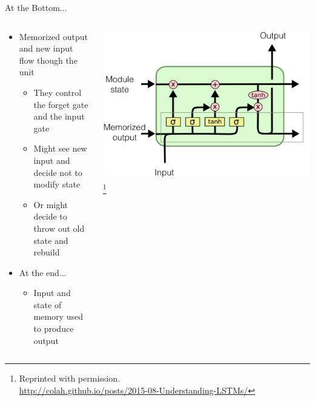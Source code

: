 \documentclass[aspectratio=169]{beamer}
\begin{document}
\begin{frame}{At the Bottom...}

\begin{columns}
\begin{column}{0.5\textwidth}
\begin{itemize}
	\item Memorized output and new input flow though the unit
        \begin{itemize}
        \item They control the forget gate and the input gate
        \item Might see new input and decide not to modify state
        \item Or might decide to throw out old state and rebuild
        \end{itemize}
	\item At the end...
	\begin{itemize}
	\item Input and state of memory used to produce output
	\end{itemize}
\end{itemize}
\end{column}
\begin{column}{0.5\textwidth}
\includegraphics[width=1\textwidth]{lectLSTM/memorized.png}
\footnote{Reprinted with permission.\\ \hspace{1.7em}\url{http://colah.github.io/posts/2015-08-Understanding-LSTMs/}}
\end{column}
\end{columns}
\end{frame}
\end{document}
